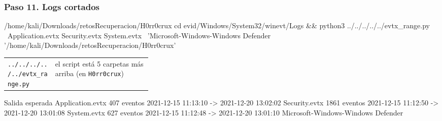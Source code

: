 \documentclass[11pt,a4paper]{article}
\begin{document}
\subsubsection*{Paso 11. Logs cortados}
\begin{comando}{/home/kali/Downloads/retosRecuperacion/H0rr0crux}
cd evid/Windows/System32/winevt/Logs && python3 ../../../../../evtx_range.py \
  Application.evtx Security.evtx System.evtx \
  'Microsoft-Windows-Windows Defender%
  '/home/kali/Downloads/retosRecuperacion/H0rr0crux'
\end{comando}
\begin{tcolorbox}[enhanced, breakable, colback=white, colframe=gray!40, boxrule=0.3pt, arc=1pt, left=4pt, right=4pt, top=2pt, bottom=2pt, fonttitle=\sffamily\scriptsize\bfseries, coltitle=black!75, colbacktitle=gray!8, title={Qué hace cada parte}, attach title to upper, before skip=2pt, after skip=4pt, fontupper=\small]
\par{\renewcommand{\arraystretch}{1.12}\begin{tabularx}{\linewidth}{@{}>{\raggedright\arraybackslash}p{0.33\linewidth}>{\raggedright\arraybackslash}X@{}}
\texttt{../\allowbreak{}../\allowbreak{}../\allowbreak{}../\allowbreak{}../\allowbreak{}evtx\_\allowbreak{}range.py} & el script está 5 carpetas más arriba (en \texttt{H0rr0crux}) \\
\end{tabularx}}
\end{tcolorbox}
\begin{salidan}{Salida esperada}
Application.evtx                                 407 eventos   2021-12-15 11:13:10  ->  2021-12-20 13:02:02
Security.evtx                                   1861 eventos   2021-12-15 11:12:50  ->  2021-12-20 13:01:08
System.evtx                                      627 eventos   2021-12-15 11:12:48  ->  2021-12-20 13:01:10
Microsoft-Windows-Windows Defender%
\end{salidan}
\end{document}
